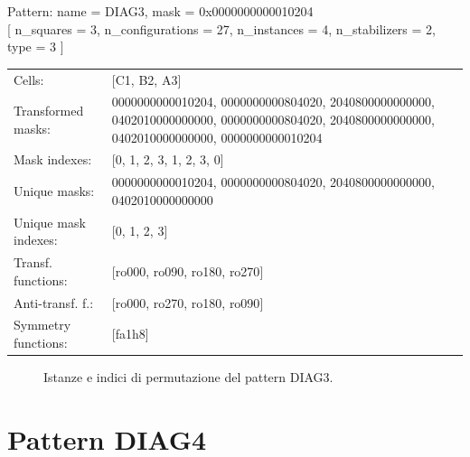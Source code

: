 \begin{tcolorbox}[sharp corners, fontupper=\ttfamily\small, colback=white]
  \noindent Pattern: name = DIAG3, mask = 0x0000000000010204\\
  {[} n\_squares = 3, n\_configurations = 27,
  n\_instances = 4, n\_stabilizers = 2, type = 3 { ]}\\[1.0ex]
  \begin{tabularx}{\textwidth}{@{} p{3.5cm} X @{}}
    Cells:               & {[}C1, B2, A3{]}\\[0.5ex]
    Transformed masks:   & 0000000000010204, 0000000000804020, 2040800000000000, 0402010000000000, 0000000000804020, 2040800000000000, 0402010000000000, 0000000000010204\\[0.5ex]
    Mask indexes:        & {[}0, 1, 2, 3, 1, 2, 3, 0{]}\\[0.5ex]
    Unique masks:        & 0000000000010204, 0000000000804020, 2040800000000000, 0402010000000000\\[0.5ex]
    Unique mask indexes: & {[}0, 1, 2, 3{]}\\[0.5ex]
    Transf. functions:   & {[}ro000, ro090, ro180, ro270{]}\\[0.5ex]
    Anti-transf. f.:     & {[}ro000, ro270, ro180, ro090{]}\\[0.5ex]
    Symmetry functions:  & {[}fa1h8{]}\\[0.5ex]
  \end{tabularx}
\end{tcolorbox}

\begin{figure}[htbp]
  \centering
   \hfill
   \hfill
   \hfill
  \vspace{0.3cm}
   \hfill
   \hfill
   \hfill
  \caption{Istanze e indici di permutazione del pattern DIAG3.}
\end{figure}

\newpage

\section{Pattern DIAG4}

